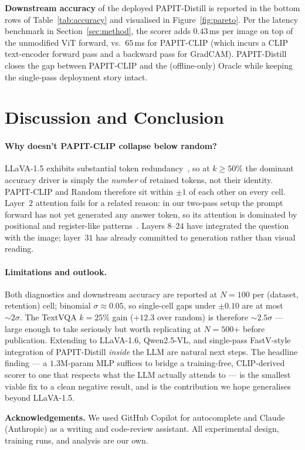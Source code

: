 \documentclass[10pt,twocolumn,letterpaper]{article}
\begin{document}

\textbf{Downstream accuracy} of the deployed PAPIT-Distill is reported
in the bottom rows of Table~\ref{tab:accuracy} and visualised in
Figure~\ref{fig:pareto}. Per the latency benchmark in
Section~\ref{sec:method}, the scorer adds $0.43$\,ms per image on top
of the unmodified ViT forward, vs.\ $65$\,ms for PAPIT-CLIP
(which incurs a CLIP text-encoder forward pass and a backward pass
for GradCAM). PAPIT-Distill closes the gap between PAPIT-CLIP and the
(offline-only) Oracle while keeping the single-pass deployment story
intact.

\section{Discussion and Conclusion}
\label{sec:discussion}

\paragraph{Why doesn't PAPIT-CLIP collapse below random?}
LLaVA-1.5 exhibits substantial token redundancy~\cite{chen2024fastv},
so at $k\!\geq\!50\%$ the dominant accuracy driver is simply the
\emph{number} of retained tokens, not their identity. PAPIT-CLIP and
Random therefore sit within $\pm 1$ of each other on every cell.
Layer~$2$ attention fails for a related reason: in our two-pass setup
the prompt forward has not yet generated any answer token, so its
attention is dominated by positional and register-like
patterns~\cite{darcet2024registers}. Layers $8$--$24$ have integrated
the question with the image; layer~$31$ has already committed to
generation rather than visual reading.

\paragraph{Limitations and outlook.}
Both diagnostics and downstream accuracy are reported at $N{=}100$
per (dataset, retention) cell; binomial $\sigma\!\approx\!0.05$, so
single-cell gaps under $\pm 0.10$ are at most $\sim 2\sigma$. The
TextVQA $k\!=\!25\%$ gain ($+12.3$ over random) is therefore
$\sim 2.5\sigma$ — large enough to take seriously but worth
replicating at $N{=}500$+ before publication. Extending to LLaVA-1.6,
Qwen2.5-VL, and single-pass FastV-style integration of PAPIT-Distill
\emph{inside} the LLM are natural next steps. The headline finding ---
a $1.3$M-param MLP suffices to bridge a training-free, CLIP-derived
scorer to one that respects what the LLM actually attends to --- is
the smallest viable fix to a clean negative result, and is the
contribution we hope generalises beyond LLaVA-1.5.

\noindent\textbf{Acknowledgements.}
We used GitHub Copilot for autocomplete and Claude (Anthropic) as a
writing and code-review assistant. All experimental design, training
runs, and analysis are our own.

{\small


}
\end{document}
